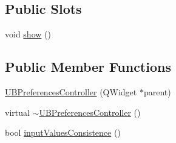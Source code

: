 \subsection*{Public Slots}
\begin{DoxyCompactItemize}
\item 
void \hyperlink{class_u_b_preferences_controller_a35e0fd13ea04e0e788649ac12b2dcdf3}{show} ()
\end{DoxyCompactItemize}
\subsection*{Public Member Functions}
\begin{DoxyCompactItemize}
\item 
\hyperlink{class_u_b_preferences_controller_a515f90bc539e0c9410c8b2b538b17017}{U\-B\-Preferences\-Controller} (Q\-Widget $\ast$parent)
\item 
virtual \hyperlink{class_u_b_preferences_controller_a23fdb0373acdd9e6039198a152c1bd77}{$\sim$\-U\-B\-Preferences\-Controller} ()
\item 
bool \hyperlink{class_u_b_preferences_controller_a4d15e8c361bfc3f791143a06ffa0bf6c}{input\-Values\-Consistence} ()
\end{DoxyCompactItemize}
